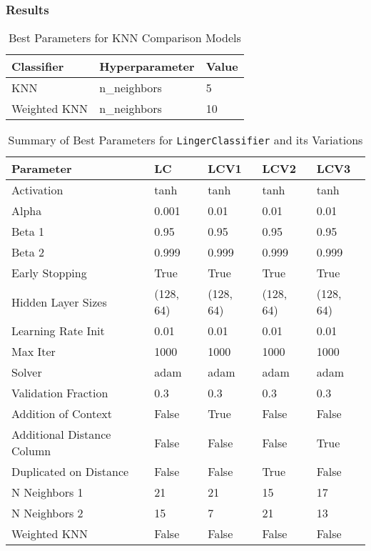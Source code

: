 \documentclass[a4paper, 12pt]{report}
\begin{document}
\subsubsection{Results}

\begin{table}[H]
    \centering
    \caption{Best Parameters for KNN Comparison Models}
    \label{tab:best_parameters_combined_knn_exp3}
    \begin{tabular}{|l|l|l|}
    \toprule
    \textbf{Classifier} & \textbf{Hyperparameter} & \textbf{Value} \\
    \midrule
    KNN & n\_neighbors & 5 \\
    Weighted KNN & n\_neighbors & 10 \\
    \bottomrule
\end{tabular}
\end{table}

\begin{table}[H]
    \centering
    \caption{Summary of Best Parameters for \texttt{LingerClassifier} and its Variations}
    \label{tab:best_parameters_summary_exp5}
    \begin{tabular}{|l|l|l|l|l|}
    \hline
    \textbf{Parameter} & \textbf{LC} & \textbf{LCV1} & \textbf{LCV2} & \textbf{LCV3} \\
    \hline
    Activation & tanh & tanh & tanh & tanh \\
    Alpha & 0.001 & 0.01 & 0.01 & 0.01 \\
    Beta 1 & 0.95 & 0.95 & 0.95 & 0.95 \\
    Beta 2 & 0.999 & 0.999 & 0.999 & 0.999 \\
    Early Stopping & True & True & True & True \\
    Hidden Layer Sizes & (128, 64) & (128, 64) & (128, 64) & (128, 64) \\
    Learning Rate Init & 0.01 & 0.01 & 0.01 & 0.01 \\
    Max Iter & 1000 & 1000 & 1000 & 1000 \\
    Solver & adam & adam & adam & adam \\
    Validation Fraction & 0.3 & 0.3 & 0.3 & 0.3 \\
    Addition of Context & False & True & False & False \\
    Additional Distance Column & False & False & False & True \\
    Duplicated on Distance & False & False & True & False \\
    N Neighbors 1 & 21 & 21 & 15 & 17 \\
    N Neighbors 2 & 15 & 7 & 21 & 13 \\
    Weighted KNN & False & False & False & False \\
    \hline
    \end{tabular}
\end{table}
\clearpage
\end{document}
